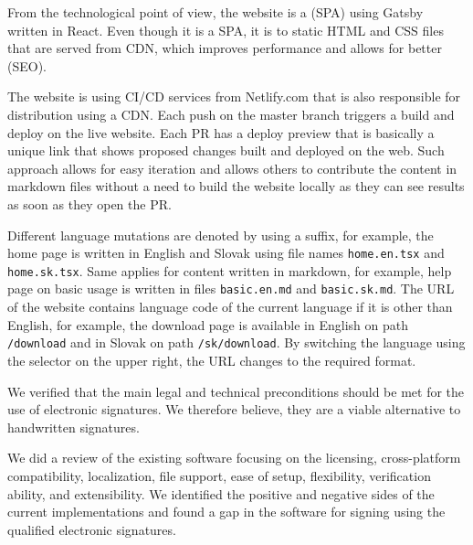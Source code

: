 \documentclass[thesismargins, english, thesislinespacing, onelinechapterstyle, upjsfrontpage]{rnthesis}
\begin{document}
From the technological point of view, the website is a  (SPA) using Gatsby written in React.
Even though it is a SPA, it is  to static HTML and CSS files that are served from CDN, which improves performance and allows for better  (SEO).

The website is using CI/CD services from Netlify.com that is also responsible for distribution using a CDN.
Each push on the master branch triggers a build and deploy on the live website.
Each PR has a deploy preview that is basically a unique link that shows proposed changes built and deployed on the web.
Such approach allows for easy iteration and allows others to contribute the content in markdown files without a need to build the website locally as they can see results as soon as they open the PR.

Different language mutations are denoted by using a suffix, for example, the home page is written in English and Slovak using file names \texttt{home.en.tsx} and \texttt{home.sk.tsx}.
Same applies for content written in markdown, for example, help page on basic usage is written in files \texttt{basic.en.md} and \texttt{basic.sk.md}.
The URL of the website contains language code of the current language if it is other than English, for example, the download page is available in English on path \texttt{/download} and in Slovak on path \texttt{/sk/download}.
By switching the language using the selector on the upper right, the URL changes to the required format.

\zaver

We verified that the main legal and technical preconditions should be met for the use of electronic signatures.
We therefore believe, they are a viable alternative to handwritten signatures.

We did a review of the existing software focusing on the licensing, cross-platform compatibility, localization, file support, ease of setup, flexibility, verification ability, and extensibility.
We identified the positive and negative sides of the current implementations and found a gap in the software for signing using the qualified electronic signatures.
\end{document}
